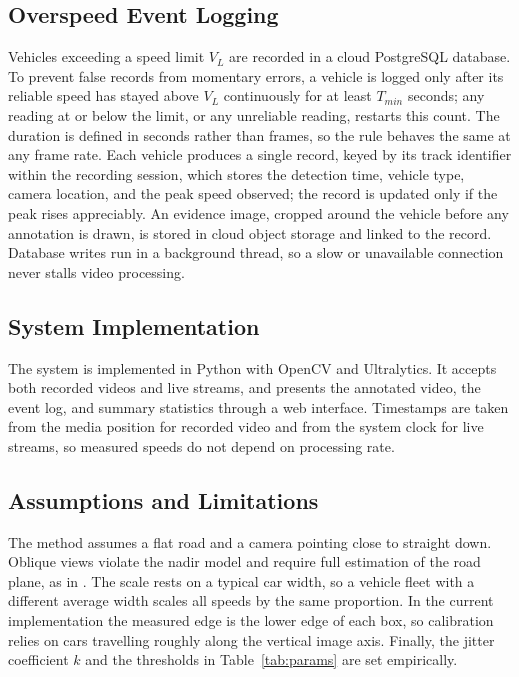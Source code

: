 \documentclass[conference]{IEEEtran}
\begin{document}
\subsection{Overspeed Event Logging}

Vehicles exceeding a speed limit $V_L$ are recorded in a cloud PostgreSQL database. To prevent false records from momentary errors, a vehicle is logged only after its reliable speed has stayed above $V_L$ continuously for at least $T_{min}$ seconds; any reading at or below the limit, or any unreliable reading, restarts this count. The duration is defined in seconds rather than frames, so the rule behaves the same at any frame rate. Each vehicle produces a single record, keyed by its track identifier within the recording session, which stores the detection time, vehicle type, camera location, and the peak speed observed; the record is updated only if the peak rises appreciably. An evidence image, cropped around the vehicle before any annotation is drawn, is stored in cloud object storage and linked to the record. Database writes run in a background thread, so a slow or unavailable connection never stalls video processing.

\subsection{System Implementation}

The system is implemented in Python with OpenCV and Ultralytics. It accepts both recorded videos and live streams, and presents the annotated video, the event log, and summary statistics through a web interface. Timestamps are taken from the media position for recorded video and from the system clock for live streams, so measured speeds do not depend on processing rate.

\subsection{Assumptions and Limitations}

The method assumes a flat road and a camera pointing close to straight down. Oblique views violate the nadir model and require full estimation of the road plane, as in \cite{ref2}. The scale rests on a typical car width, so a vehicle fleet with a different average width scales all speeds by the same proportion. In the current implementation the measured edge is the lower edge of each box, so calibration relies on cars travelling roughly along the vertical image axis. Finally, the jitter coefficient $k$ and the thresholds in Table~\ref{tab:params} are set empirically.
\end{document}
